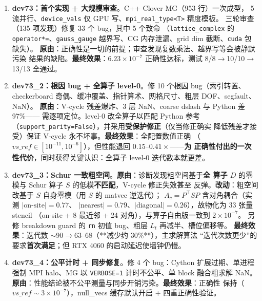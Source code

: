 \documentclass[11pt,a4paper]{article}
\begin{document}
\begin{enumerate}
  \item \textbf{dev73：首个实现 + 大规模审查}。C++ Clover MG（953 行）一次成型，
        5 流并行、\texttt{device\_vals} 仅 GPU 写、\texttt{mpi\_real\_type<T>} 精度模板。
        三轮审查（135 项发现）修复 33 个 bug，其中 5 个致命
        （\texttt{lattice\_complex} 的 \texttt{operator*=}、\texttt{gauss\_gauge}
        越界写、CG 内存泄漏、grid dim 截断、\texttt{cuda} 包缺失）。
        \textbf{原由}：正确性是一切的前提；审查发现复数乘法、越界写等会被静默污染
        结果的缺陷。\textbf{最终效果}：$6.23\times10^{-7}$ 正确性达标，测试 8/8$\to$10/10$\to$13/13
        全通过。
  \item \textbf{dev73\_2：根因 bug + 全算子 level-0}。修 10 个根因 bug（索引转置、
        checkerboard 奇偶、缓冲覆盖、指针算术、网格尺寸、粗层 DOF、segfault、NaN）。
        \textbf{原由}：V-cycle 残差爆炸、3 层 NaN、coarse dslash 与 Python 差 97\%——
        需逐项定位。level-0 改全算子以匹配 Python 参考
        （\texttt{support\_parity=False}），并采用\textbf{受保护修正}（仅当修正确实
        降低残差才接受）保证 V-cycle 永不坏事。\textbf{最终效果}：全配置数值正确
        （$vs\_ref\in[10^{-11},10^{-6}]$），但性能退回 $0.15$--$0.41\times$——\textbf{为
        正确性付出的一次性代价}，同时获得关键认识：全算子 level-0 迭代数本就更差。
  \item \textbf{dev73\_3：Schur 一致粗空间}。\textbf{原由}：诊断发现粗空间基于\textbf{全
        算子 $D$} 的零模与 Schur 算子 $S$ 的低模\textbf{不匹配}，V-cycle 修正失效甚至
        反弹。\textbf{改动}：粗空间改基于 $S$ 自身零模（用 $S$ 的 matvec 逆迭代）；
        $A_c=P^\top S P$ 含对角耦合（实测 $|\text{on-site}|=0.77$、
        $|\text{nearest}|=0.79$、$|\text{diagonal}|=0.26$），故物化为 33 张量 stencil
        （on-site + 8 最近邻 + 24 对角），与算子自由版一致到 $2\times10^{-7}$。
        另修 breakdown guard 的 \texttt{rn} 初值 bug、粗层 $L_t$ 再减半、槽位偏移等。
        \textbf{最终效果}：迭代数 $\sim$90$\to$63--68（**减少约 30\%**），主求解算法
        ``迭代次数更少''的要求\textbf{首次满足}；但 RTX 4060 的启动延迟使墙钟仍慢。
  \item \textbf{dev73\_4：公平计时 + 同步修复}。修 4 个 bug：Cython 扩展过期、单进程
        强制 MPI halo、MG 以 \texttt{VERBOSE=1} 计时不公平、单 block 融合粗求解 NaN。
        \textbf{原由}：性能结论被不公平测量与同步开销污染。\textbf{最终效果}：正确性
        保持（$vs\_ref\sim3\times10^{-7}$），null\_vecs 缓存默认开启 + 四重正确性验证。
\end{enumerate}
\end{document}
